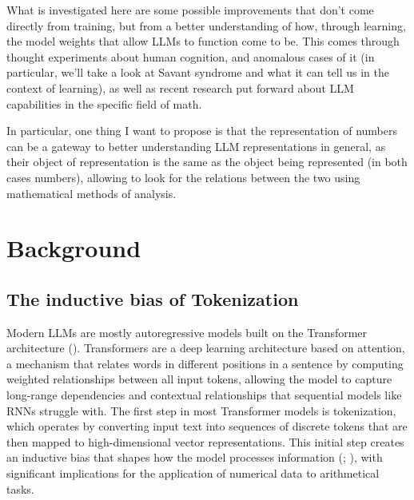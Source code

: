 \documentclass[
  a4paper, twoside, 10pt, titlepage]{book}
\begin{document}
What is investigated here are some possible improvements that don't come
directly from training, but from a better understanding of how, through
learning, the model weights that allow LLMs to function come to be. This
comes through thought experiments about human cognition, and anomalous
cases of it (in particular, we'll take a look at Savant syndrome and
what it can tell us in the context of learning), as well as recent
research put forward about LLM capabilities in the specific field of
math.

In particular, one thing I want to propose is that the representation of
numbers can be a gateway to better understanding LLM representations in
general, as their object of representation is the same as the object
being represented (in both cases numbers), allowing to look for the
relations between the two using mathematical methods of analysis.

\chapter{Background}\label{background}

\section{The inductive bias of
Tokenization}\label{the-inductive-bias-of-tokenization}

Modern LLMs are mostly autoregressive models built on the Transformer
architecture ().
Transformers are a deep learning architecture based on attention, a
mechanism that relates words in different positions in a sentence by
computing weighted relationships between all input tokens, allowing the
model to capture long-range dependencies and contextual relationships
that sequential models like RNNs struggle with. The first step in most
Transformer models is tokenization, which operates by converting input
text into sequences of discrete tokens that are then mapped to
high-dimensional vector representations. This initial step creates an
inductive bias that shapes how the model processes information
(;
), with significant
implications for the application of numerical data to arithmetical
tasks.
\end{document}
